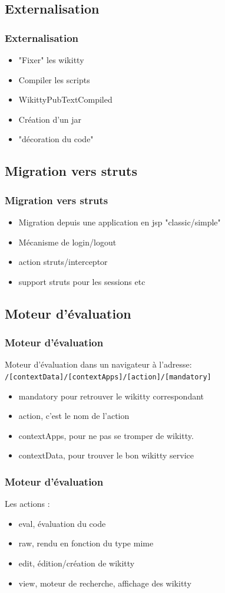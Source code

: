 \documentclass[12pt,a4paper,utf8x]{beamer}
\begin{document}
\subsection*{Externalisation}
\begin{frame}\frametitle{Externalisation}
\begin{itemize}
\item "Fixer" les wikitty
\item Compiler les scripts
\item WikittyPubTextCompiled
\item Création d'un jar
\item "décoration du code"
\end{itemize}
\end{frame}


\subsection*{Migration vers struts}
\begin{frame}\frametitle{Migration vers struts}
\begin{itemize}
\item Migration depuis une application en jsp "classic/simple"
\item Mécanisme de login/logout
\item action struts/interceptor
\item support struts pour les sessions etc
\end{itemize}
\end{frame}


\subsection*{Moteur d'évaluation}
\begin{frame}\frametitle{Moteur d'évaluation}

Moteur d'évaluation dans un navigateur à l'adresse:\\
\verb!/[contextData]/[contextApps]/[action]/[mandatory]!

\begin{itemize}
\item mandatory pour retrouver le wikitty correspondant
\item action, c'est le nom de l'action
\item contextApps, pour ne pas se tromper de wikitty.
\item contextData, pour trouver le bon wikitty service
\end{itemize}



\end{frame}
\begin{frame}\frametitle{Moteur d'évaluation}
Les actions :
\begin{itemize}
\item eval, évaluation du code
\item raw, rendu en fonction du type mime
\item edit, édition/création de wikitty
\item view, moteur de recherche, affichage des wikitty
\end{itemize}
\end{frame}
\end{document}
